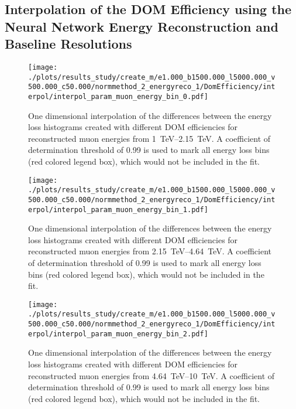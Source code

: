 %

\subsection*{Interpolation of the DOM Efficiency using the Neural Network Energy Reconstruction and Baseline Resolutions}

\begin{figure}[H]
    \centering
    \texttt{[image: ./plots/results\_study/create\_m/e1.000\_b1500.000\_l5000.000\_v500.000\_c50.000/normmethod\_2\_energyreco\_1/DomEfficiency/interpol/interpol\_param\_muon\_energy\_bin\_0.pdf]}
    \caption{One dimensional interpolation of the differences between the energy loss histograms created with different DOM efficiencies for reconstructed muon energies from \SIrange{1}{2.15}{TeV}. A coefficient of determination threshold of \num{0.99} is used to mark all energy loss bins (red colored legend box), which would not be included in the fit.}
    \label{fig:study_1d_interpol_mu0_nn_base_eff}
\end{figure}

\begin{figure}[H]
    \centering
    \texttt{[image: ./plots/results\_study/create\_m/e1.000\_b1500.000\_l5000.000\_v500.000\_c50.000/normmethod\_2\_energyreco\_1/DomEfficiency/interpol/interpol\_param\_muon\_energy\_bin\_1.pdf]}
    \caption{One dimensional interpolation of the differences between the energy loss histograms created with different DOM efficiencies for reconstructed muon energies from \SIrange{2.15}{4.64}{TeV}. A coefficient of determination threshold of \num{0.99} is used to mark all energy loss bins (red colored legend box), which would not be included in the fit.}
    \label{fig:study_1d_interpol_mu1_nn_base_eff}
\end{figure}

\begin{figure}[H]
    \centering
    \texttt{[image: ./plots/results\_study/create\_m/e1.000\_b1500.000\_l5000.000\_v500.000\_c50.000/normmethod\_2\_energyreco\_1/DomEfficiency/interpol/interpol\_param\_muon\_energy\_bin\_2.pdf]}
    \caption{One dimensional interpolation of the differences between the energy loss histograms created with different DOM efficiencies for reconstructed muon energies from \SIrange{4.64}{10}{TeV}. A coefficient of determination threshold of \num{0.99} is used to mark all energy loss bins (red colored legend box), which would not be included in the fit.}
    \label{fig:study_1d_interpol_mu2_nn_base_eff}
\end{figure}

